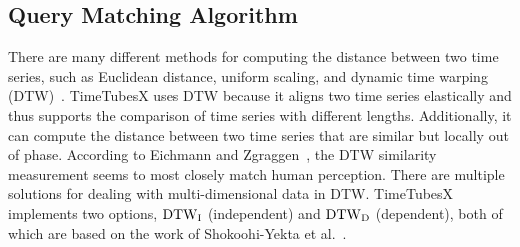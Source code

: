 \subsection{Query Matching Algorithm}\label{sec:matchingAlgorithm}
%
There are many different methods for computing the distance between two time series, such as Euclidean distance, uniform scaling, and dynamic time warping (DTW)~\cite{Berndt1994}.
TimeTubesX uses DTW
because it aligns two time series elastically and thus supports the comparison of time series with different lengths.
Additionally, it can compute the distance between two time series that are similar but locally out of phase.
According to Eichmann and Zgraggen~\cite{Eichmann2015}, the DTW similarity measurement seems to most closely match human perception.
There are multiple solutions for dealing with multi-dimensional data in DTW. 
TimeTubesX implements two options, ${\rm DTW}_{\rm I}$ (independent) and ${\rm DTW}_{\rm D}$ (dependent), both of which are based on the work of Shokoohi-Yekta et al.~\cite{Shokoohi-Yekta2015}.

